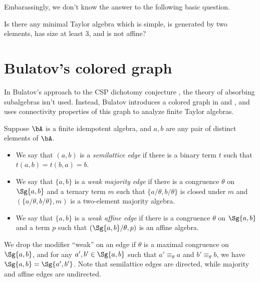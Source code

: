 Embarassingly, we don't know the answer to the following basic question.

\begin{prob} Is there any minimal Taylor algebra which is simple, is generated by two elements, has size at least $3$, and is not affine?
\end{prob}




\section{Bulatov's colored graph}

In Bulatov's approach to the CSP dichotomy conjecture \cite{bulatov-dichotomy}, the theory of absorbing subalgebras isn't used. Instead, Bulatov introduces a colored graph in \cite{colored-graph-prelim} and \cite{colored-graph}, and uses connectivity properties of this graph to analyze finite Taylor algebras.

\begin{defn} Suppose $\bA$ is a finite idempotent algebra, and $a, b$ are any pair of distinct elements of $\bA$.
\begin{itemize}
\item We say that $(a,b)$ is a \emph{semilattice edge} if there is a binary term $t$ such that $t(a,b) = t(b,a) = b$.
\item We say that $\{a,b\}$ is a \emph{weak majority edge} if there is a congruence $\theta$ on $\Sg\{a,b\}$ and a ternary term $m$ such that $\{a/\theta,b/\theta\}$ is closed under $m$ and $(\{a/\theta,b/\theta\},m)$ is a two-element majority algebra.
\item We say that $\{a,b\}$ is a \emph{weak affine edge} if there is a congruence $\theta$ on $\Sg\{a,b\}$ and a term $p$ such that $(\Sg\{a,b\}/\theta, p)$ is an affine algebra.
\end{itemize}
We drop the modifier ``weak'' on an edge if $\theta$ is a maximal congruence on $\Sg\{a,b\}$, and for any $a', b' \in \Sg\{a,b\}$ such that $a' \equiv_\theta a$ and $b' \equiv_\theta b$, we have $\Sg\{a,b\} = \Sg\{a',b'\}$. Note that semilattice edges are directed, while majority and affine edges are undirected.
\end{defn}

